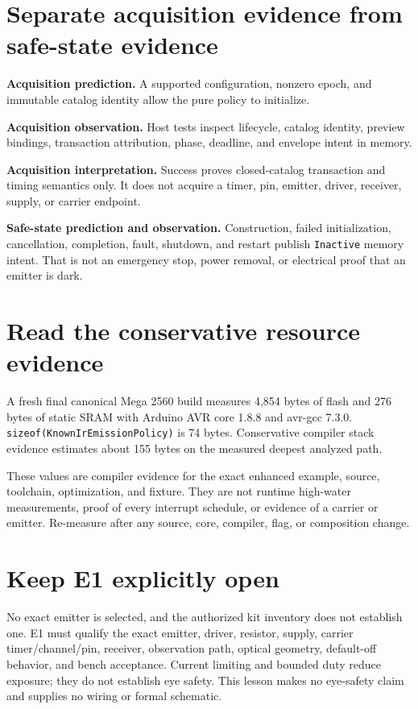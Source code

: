 \documentclass[10pt]{article}
\begin{document}
\section{Separate acquisition evidence from safe-state evidence}
\textbf{Acquisition prediction.} A supported configuration, nonzero epoch,
and immutable catalog identity allow the pure policy to initialize.

\textbf{Acquisition observation.} Host tests inspect lifecycle, catalog
identity, preview bindings, transaction attribution, phase, deadline, and
envelope intent in memory.

\textbf{Acquisition interpretation.} Success proves closed-catalog
transaction and timing semantics only. It does not acquire a timer, pin,
emitter, driver, receiver, supply, or carrier endpoint.

\textbf{Safe-state prediction and observation.} Construction, failed
initialization, cancellation, completion, fault, shutdown, and restart publish
\texttt{Inactive} memory intent. That is not an emergency stop, power removal,
or electrical proof that an emitter is dark.

\section{Read the conservative resource evidence}
A fresh final canonical Mega 2560 build measures 4,854 bytes of flash and
276 bytes of static SRAM with Arduino AVR core 1.8.8 and avr-gcc 7.3.0.
\texttt{sizeof(KnownIrEmissionPolicy)} is 74 bytes. Conservative compiler
stack evidence estimates about 155 bytes on the measured deepest analyzed
path.

These values are compiler evidence for the exact enhanced example, source,
toolchain, optimization, and fixture. They are not runtime high-water
measurements, proof of every interrupt schedule, or evidence of a carrier or
emitter. Re-measure after any source, core, compiler, flag, or composition
change.

\section{Keep E1 explicitly open}
No exact emitter is selected, and the authorized kit inventory does not
establish one. E1 must qualify the exact emitter, driver, resistor, supply,
carrier timer/channel/pin, receiver, observation path, optical geometry,
default-off behavior, and bench acceptance. Current limiting and bounded duty
reduce exposure; they do not establish eye safety. This lesson makes no
eye-safety claim and supplies no wiring or formal schematic.
\end{document}
